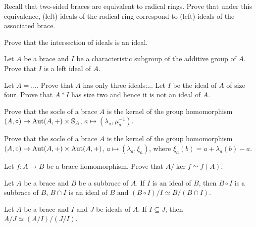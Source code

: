 \begin{prob}
\label{prob:radical}
Recall that two-sided braces are equivalent to radical rings. Prove that under this equivalence, 
(left) ideals of the radical ring correspond to (left) ideals of the associated brace. 
\end{prob}

\begin{prob}
\label{prob:sum_ideals}
Prove that the intersection of ideals is an ideal. 
\end{prob}

\begin{prob}
Let $A$ be a brace and $I$ be a characteristic subgroup of the additive group of $A$. Prove that
$I$ is a left ideal of $A$. 
\end{prob}

\begin{prob}
Let $A=...$. Prove that $A$ has only three ideals:... Let $I$ be the ideal of $A$ of size four. Prove that
$A*I$ has size two and hence it is not an ideal of $A$. 
\end{prob}

\begin{prob}
\label{prob:Bachiller1}
Prove that the socle of a brace $A$ is the kernel of the 
group homomorphism $(A,\circ)\to\operatorname{Aut}(A,+)\times\mathbb{S}_A$, $a\mapsto (\lambda_a,\mu_a^{-1})$. 
\end{prob}

\begin{prob}
\label{prob:Bachiller2}
Prove that the socle of a brace $A$ is the kernel of the 
group homomorphism $(A,\circ)\to\operatorname{Aut}(A,+)\times\operatorname{Aut}(A,+)$, $a\mapsto (\lambda_a,\xi_a)$, where
$\xi_a(b)=a+\lambda_a(b)-a$. 
\end{prob}

\begin{prob}
\label{prob:iso1}
    Let $f\colon A\to B$ be a brace homomorphism. Prove that $A/\ker f\simeq f(A)$. 
\end{prob}

\begin{prob}
\label{prob:iso2}
    Let $A$ be a brace and $B$ be a subbrace of $A$. If $I$ is an ideal of $B$, 
    then $B\circ I$ is a subbrace of $B$, 
    $B\cap I$ is an ideal of $B$ and $(B\circ I)/I\simeq B/(B\cap I)$. 
\end{prob}

\begin{prob}
\label{prob:iso3}
Let $A$ be a brace and $I$ and $J$ be ideals of $A$. If $I\subseteq J$, then
$A/J\simeq (A/I)/(J/I)$. 
\end{prob}

